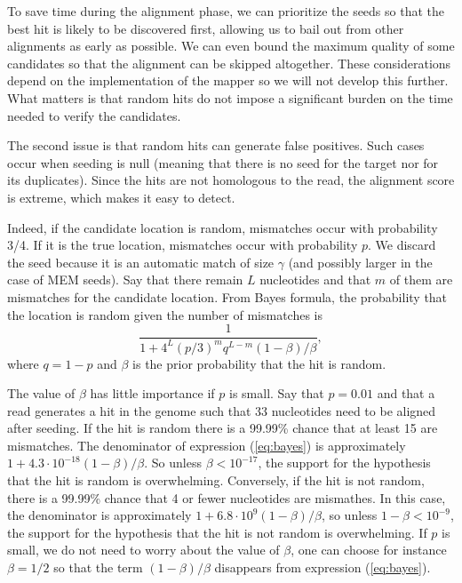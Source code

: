 \documentclass{article}
\begin{document}
To save time during the alignment phase, we can prioritize the seeds so
that the best hit is likely to be discovered first, allowing us to bail
out from other alignments as early as possible. We can even bound the
maximum quality of some candidates so that the alignment can be skipped
altogether. These considerations depend on the implementation of the
mapper so we will not develop this further. What matters is that random
hits do not impose a significant burden on the time needed to verify the
candidates.

The second issue is that random hits can generate false positives. Such
cases occur when seeding is null (meaning that there is no seed for the
target nor for its duplicates). Since the hits are not homologous to the
read, the alignment score is extreme, which makes it easy to detect.

Indeed, if the candidate location is random, mismatches occur with
probability 3/4. If it is the true location, mismatches occur with
probability $p$. We discard the seed because it is an automatic match of
size $\gamma$ (and possibly larger in the case of MEM seeds). Say that
there remain $L$ nucleotides and that $m$ of them are mismatches for the
candidate location. From Bayes formula, the probability that the location
is random given the number of mismatches is
\begin{equation}
\label{eq:bayes}
\frac{1}{1 + 4^L(p/3)^mq^{L-m}(1-\beta)/\beta},
\end{equation}
where $q=1-p$ and $\beta$ is the prior probability that the hit is
random.

The value of $\beta$ has little importance if $p$ is small. Say that
$p=0.01$ and that a read generates a hit in the genome such that 33
nucleotides need to be aligned after seeding. If the hit is random there
is a 99.99\% chance that at least 15 are mismatches. The denominator of
expression (\ref{eq:bayes}) is approximately $1 +
4.3\cdot10^{-18}(1-\beta)/\beta$. So unless $\beta < 10^{-17}$, the
support for the hypothesis that the hit is random is overwhelming.
Conversely, if the hit is not random, there is a 99.99\% chance that 4 or
fewer nucleotides are mismathes. In this case, the denominator is
approximately $1+6.8\cdot10^9(1-\beta)/\beta$, so unless $1-\beta <
10^{-9}$, the support for the hypothesis that the hit is not random is
overwhelming. If $p$ is small, we do not need to worry about the value of
$\beta$, one can choose for instance $\beta=1/2$ so that the term
$(1-\beta)/\beta$ disappears from expression (\ref{eq:bayes}).
\end{document}
